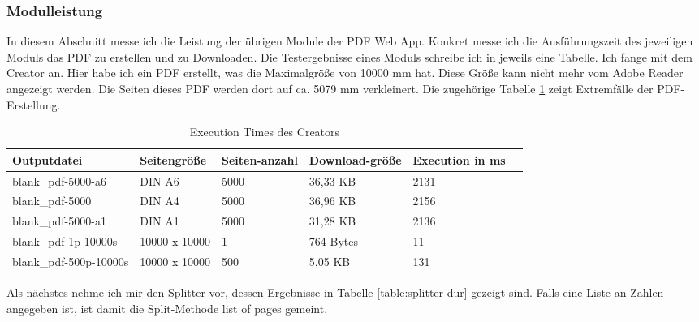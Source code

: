 \subsubsection{Modulleistung}
In diesem Abschnitt messe ich die Leistung der übrigen Module der PDF Web App. Konkret messe ich die Ausführungszeit des jeweiligen Moduls das PDF zu erstellen und zu Downloaden. Die Testergebnisse eines Moduls schreibe ich in jeweils eine Tabelle. Ich fange mit dem Creator an. Hier habe ich ein PDF erstellt, was die Maximalgröße von 10000 mm hat. Diese Größe kann nicht mehr vom Adobe Reader angezeigt werden. Die Seiten dieses PDF werden dort auf ca. 5079 mm verkleinert. Die zugehörige Tabelle \ref{table:creator-dur} zeigt Extremfälle der PDF-Erstellung.

\begin{table}[!htbp]
	\centering
	\begin{tabular}{|p{3cm}|p{3cm}|p{2cm}|p{2cm}|p{2cm}|p{2cm}|}
		\hline
		\textbf{Outputdatei}						& \textbf{Seitengröße}	& \textbf{Seiten-anzahl}	& \textbf{Download-größe}	& \textbf{Execution in ms} 	\\ 
		\hline
		blank\_pdf-5000-a6							& DIN A6 				& 5000 						& 36,33 KB 					& 2131  					\\
		blank\_pdf-5000								& DIN A4 				& 5000 						& 36,96 KB 					& 2156   					\\
		blank\_pdf-5000-a1							& DIN A1 				& 5000 						& 31,28 KB 					& 2136   					\\
		blank\_pdf-1p-10000s						& 10000 x 10000			& 1 						& 764 Bytes					& 11						\\	
		blank\_pdf-500p-10000s						& 10000 x 10000			& 500 						& 5,05 KB					& 131						\\	
		\hline
	\end{tabular}
	\caption{Execution Times des Creators}
	\label{table:creator-dur}
\end{table}

Als nächstes nehme ich mir den Splitter vor, dessen Ergebnisse in Tabelle \ref{table:splitter-dur} gezeigt sind. Falls eine Liste an Zahlen angegeben ist, ist damit die Split-Methode list of pages gemeint.

